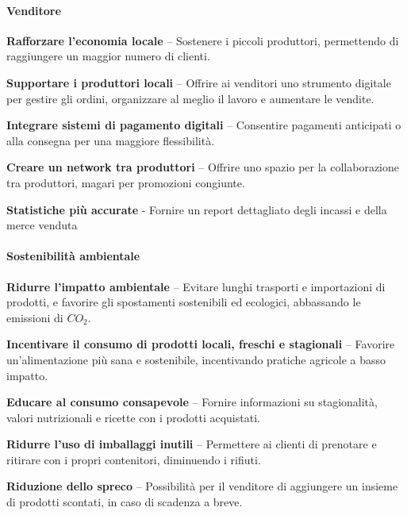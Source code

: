 \paragraph{Venditore}
\begin{objitem}
    \item  \textbf{Rafforzare l'economia locale} – Sostenere i piccoli produttori, permettendo di raggiungere un maggior numero di clienti.
    \item  \textbf{Supportare i produttori locali} – Offrire ai venditori uno strumento digitale per gestire gli ordini, organizzare al meglio il lavoro e aumentare le vendite.
    \item  \textbf{Integrare sistemi di pagamento digitali} – Consentire pagamenti anticipati o alla consegna per una maggiore flessibilità.
    \item  \textbf{Creare un network tra produttori} – Offrire uno spazio per la collaborazione tra produttori, magari per promozioni congiunte.
    \item \textbf{Statistiche più accurate} - Fornire un report dettagliato degli incassi e della merce venduta
\end{objitem}

\newpage

\paragraph{Sostenibilità ambientale}    
\begin{objitem}
    \item  \textbf{Ridurre l'impatto ambientale} – Evitare lunghi trasporti e importazioni di prodotti, e favorire gli spostamenti sostenibili ed ecologici, abbassando le emissioni di $CO_2$.
    \item  \textbf{Incentivare il consumo di prodotti locali, freschi e stagionali} – Favorire un'alimentazione più sana e sostenibile, incentivando pratiche agricole a basso impatto.
    \item  \textbf{Educare al consumo consapevole} – Fornire informazioni su stagionalità, valori nutrizionali e ricette con i prodotti acquistati.
    \item  \textbf{Ridurre l'uso di imballaggi inutili} – Permettere ai clienti di prenotare e ritirare con i propri contenitori, diminuendo i rifiuti.
    \item \textbf{Riduzione dello spreco} – Possibilità per il venditore di aggiungere un insieme di prodotti scontati, in caso di scadenza a breve. 
\end{objitem}


